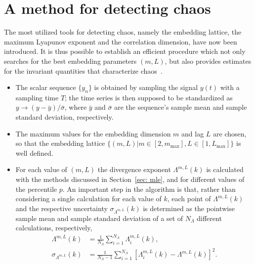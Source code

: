 \section{A method for detecting chaos}\label{sec: method for chaos}

The most utilized tools for detecting chaos, namely the embedding lattice, the maximum Lyapunov exponent
and the correlation dimension, have now been introduced.
It is thus possible to establish an efficient procedure which not only searches for the best
embedding parameters $(m,L)$, but also provides estimates for the invariant quantities that
characterize chaos~\cite{ref:perinelli2020chasing}.

\begin{itemize}

\item
The scalar sequence $\{y_n\}$ is obtained by sampling the signal $y(t)$ with a sampling time $T$;
the time series is then supposed to be standardized as
$y \rightarrow (y - \bar{y})/\bar{\sigma}$, where $\bar{y}$ and $\bar{\sigma}$ are the sequence's
sample mean and sample standard deviation, respectively.


\item
The maximum values for the embedding dimension $m$ and lag $L$ are chosen, so that the embedding
lattice $\{(m,L)|m\in[2,m_{\max}],L\in[1,L_{\max}]\}$ is well defined.


\item
For each value of $(m,L)$ the divergence exponent $\Lambda^{m,L}(k)$ is calculated with the methods
discussed in Section~\ref{sec: mle}, and for different values of the percentile $p$.
An important step in the algorithm is that, rather than
considering a single calculation for each value of $k$, each point of $\Lambda^{m,L}(k)$
and the respective uncertainty $\sigma_{\Lambda^{m,L}}(k)$ is determined
as the pointwise sample mean and sample standard
deviation of a set of $N_\Lambda$ different calculations, respectively,
\begin{equation}
\begin{aligned}
    \label{eq: sample mean divergence exponent}
    \Lambda^{m,L}(k)&=\frac{1}{N_\Lambda}\sum_{i=1}^{N_\Lambda}\Lambda_i^{m,L}(k),\\
    \sigma_{\Lambda^{m,L}}(k) &= \frac{1}{N_\Lambda-1}\sum_{i=1}^{N_\Lambda}{\left[
        \Lambda_i^{m,L}(k)-\Lambda^{m,L}(k)
    \right]}^2.
\end{aligned}
\end{equation}



\end{itemize}
